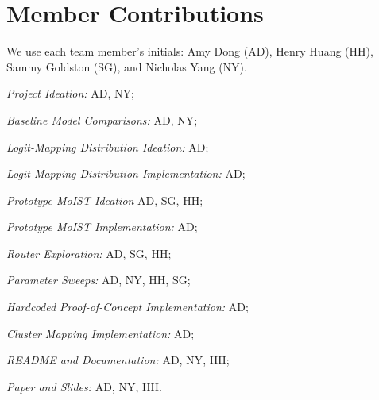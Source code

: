 \documentclass[conference]{IEEEtran}
\begin{document}
\section{Member Contributions}
We use each team member's initials: Amy Dong (AD), Henry Huang (HH), Sammy Goldston (SG), and Nicholas Yang (NY).

\textit{Project Ideation:} AD, NY; 

\textit{Baseline Model Comparisons:} AD, NY; 

\textit{Logit-Mapping Distribution Ideation:} AD; 

\textit{Logit-Mapping Distribution Implementation:} AD; 

\textit{Prototype MoIST Ideation} AD, SG, HH;

\textit{Prototype MoIST Implementation:} AD; 

\textit{Router Exploration:} AD, SG, HH; 

\textit{Parameter Sweeps:} AD, NY, HH, SG; 

\textit{Hardcoded Proof-of-Concept Implementation:} AD;

\textit{Cluster Mapping Implementation:} AD; 

\textit{README and Documentation:} AD, NY, HH;

\textit{Paper and Slides:} AD, NY, HH.

 

\end{document}
